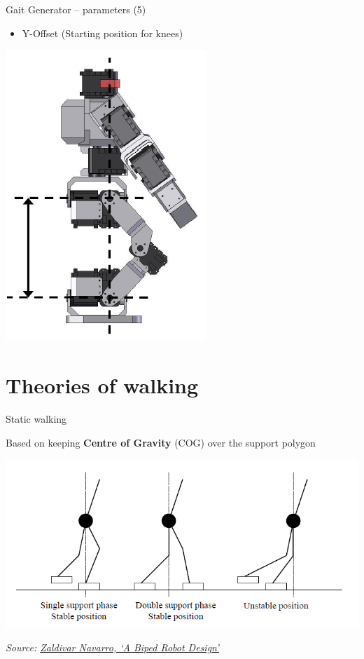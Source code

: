 \documentclass[compress]{beamer}
\newcommand{\source}[2]{{\tiny\it Source: \href{#1}{#2}}}
\begin{document}
\begin{frame}{Gait Generator -- parameters (5)}

    \begin{itemize}

        \item Y-Offset (Starting position for knees)
    \end{itemize}
    \begin{center}
        \includegraphics[height=0.5\paperheight]{bioloid-gait-5}
    \end{center}

\end{frame}

\section{Theories of walking}

\begin{frame}{Static walking}

    Based on keeping \textbf{Centre of Gravity} (COG) over the support polygon

    \begin{center}
        \includegraphics[width=0.8\linewidth]{image45}
        
    \source{http://www.diss.fu-berlin.de/diss/servlets/MCRFileNodeServlet/FUDISS_derivate_000000002504/05_Kapitel5.pdf}{Zaldivar Navarro, `A Biped Robot Design'}
    \end{center}
\end{frame}
\end{document}
